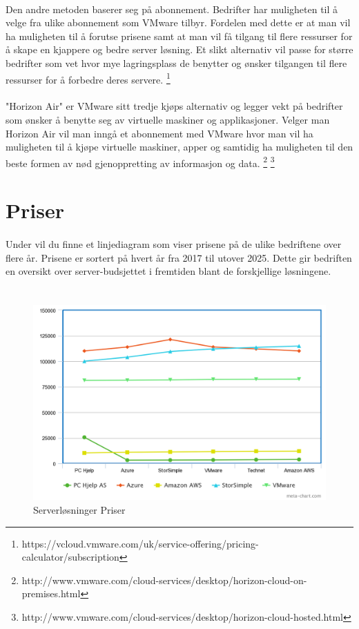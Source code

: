 \paragraph{} Den andre metoden baserer seg på abonnement. Bedrifter har muligheten til å velge fra ulike abonnement som VMware tilbyr. Fordelen med dette er at man vil ha muligheten til å forutse prisene samt at man vil få tilgang til flere ressurser for å skape en kjappere og bedre server løsning. Et slikt alternativ vil passe for større bedrifter som vet hvor mye lagringsplass de benytter og ønsker tilgangen til flere ressurser for å forbedre deres servere.
\footnote{https://vcloud.vmware.com/uk/service-offering/pricing-calculator/subscription}

\paragraph{} "Horizon Air" er VMware sitt tredje kjøps alternativ og legger vekt på bedrifter som ønsker å benytte seg av virtuelle maskiner og applikasjoner. Velger man Horizon Air vil man inngå et abonnement med VMware hvor man vil ha muligheten til å kjøpe virtuelle maskiner, apper og samtidig ha muligheten til den beste formen av nød gjenoppretting av informasjon og data.
\footnote{http://www.vmware.com/cloud-services/desktop/horizon-cloud-on-premises.html}
\footnote{http://www.vmware.com/cloud-services/desktop/horizon-cloud-hosted.html}

\newpage
\section{Priser}
\paragraph{} Under vil du finne et linjediagram som viser prisene på de ulike bedriftene over flere år. Prisene er sortert på hvert år fra 2017 til utover 2025.
Dette gir bedriften en oversikt over server-budsjettet i fremtiden blant de forskjellige løsningene. 

\section*{}
\begin{figure}[H]
\centering
\includegraphics[width=5.5in]{Bilder/priser2.png}
\caption{Serverløsninger Priser}
\end{figure}